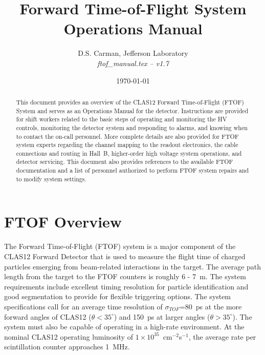 \documentclass[12pt]{article}
\begin{document}
\title{Forward Time-of-Flight System Operations Manual}

\vskip 0.5cm

\author{D.S. Carman, Jefferson Laboratory\\[0.2ex]
{\it ftof\_manual.tex -- v1.7}}

\date \today
%
\maketitle

\begin{abstract}
This document provides an overview of the CLAS12 Forward Time-of-Flight (FTOF) System 
and serves as an Operations Manual for the detector. Instructions are provided for 
shift workers related to the basic steps of operating and monitoring the HV controls, 
monitoring the detector system and responding to alarms, and knowing when to contact 
the on-call personnel. More complete details are also provided for FTOF system experts 
regarding the channel mapping to the readout electronics, the cable connections and 
routing in Hall~B, higher-order high voltage system operations, and detector servicing. 
This document also provides references to the available FTOF documentation and a list 
of personnel authorized to perform FTOF system repairs and to modify system settings.
\end{abstract}

\thispagestyle{empty}

\clearpage

\vfil
\eject

\tableofcontents

\vfil
\eject

\section{FTOF Overview}
\label{intro}

The Forward Time-of-Flight (FTOF) system is a major component of the CLAS12 Forward 
Detector that is used to measure the flight time of charged particles emerging from 
beam-related interactions in the target. The average path length from the target to 
the FTOF counters is roughly 6 - 7~m. The system requirements include excellent timing 
resolution for particle identification and good segmentation to provide for flexible 
triggering options. The system specifications call for an average time resolution of 
$\sigma_{TOF}$=80~ps at the more forward angles of CLAS12 ($\theta < 35^\circ$) and 
150~ps at larger angles ($\theta > 35^\circ$). The system must also be capable of 
operating in a high-rate environment. At the nominal CLAS12 operating luminosity of 
$1 \times 10^{35}$~cm$^{-2}$s$^{-1}$, the average rate per scintillation counter approaches
1~MHz.
\end{document}
